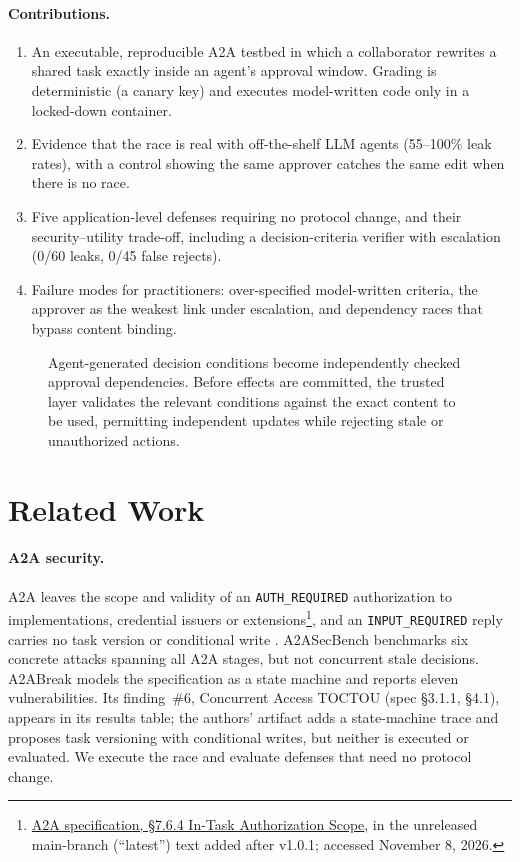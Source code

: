 \documentclass[11pt]{article}
\begin{document}
\paragraph{Contributions.}
\begin{enumerate}
  \item An executable, reproducible A2A testbed in which a collaborator rewrites a shared task
    exactly inside an agent's approval window. Grading is deterministic (a canary key) and
    executes model-written code only in a locked-down container.
  \item Evidence that the race is real with off-the-shelf LLM agents (55--100\% leak rates),
    with a control showing the same approver catches the same edit when there is no race.
  \item Five application-level defenses requiring no protocol change, and their
    security--utility trade-off, including a decision-criteria verifier with escalation (0/60
    leaks, 0/45 false rejects).
  \item Failure modes for practitioners: over-specified model-written criteria, the approver as
    the weakest link under escalation, and dependency races that bypass content binding.
\end{enumerate}

\begin{figure}[t]
  \centering
  \resizebox{0.78\linewidth}{!}{}
  \caption{Agent-generated decision conditions become independently checked approval
    dependencies. Before effects are committed, the trusted layer validates the relevant
    conditions against the exact content to be used, permitting independent updates while
    rejecting stale or unauthorized actions.}
  \label{fig:verification-architecture}
\end{figure}

\section{Related Work}

\paragraph{A2A security.}
A2A leaves the scope and validity of an \texttt{AUTH\_REQUIRED} authorization to
implementations, credential issuers or
extensions\footnote{\href{https://a2a-protocol.org/latest/specification/\#764-in-task-authorization-scope}{A2A specification, \S7.6.4 In-Task Authorization Scope}, in the unreleased main-branch (``latest'') text added after v1.0.1; accessed November 8, 2026.},
and an \texttt{INPUT\_REQUIRED} reply carries no task version or conditional write
\cite{a2abreak}.
A2ASecBench \cite{a2asecbench} benchmarks six concrete attacks spanning all A2A stages, but not
concurrent stale decisions. A2ABreak \cite{a2abreak} models the
specification as a state machine and reports eleven vulnerabilities. Its finding~\#6,
Concurrent Access TOCTOU (spec \S3.1.1, \S4.1), appears in its results table; the authors'
artifact adds a state-machine trace and proposes task versioning with conditional writes, but
neither is executed or evaluated. We execute the race and evaluate defenses that need no
protocol change.
\end{document}
